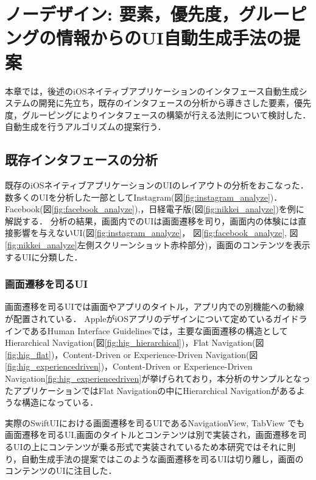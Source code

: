 \chapter{ノーデザイン: 要素，優先度，グルーピングの情報からのUI自動生成手法の提案}
\label{chap:auto-gen}

本章では，後述のiOSネイティブアプリケーションのインタフェース自動生成システムの開発に先立ち，既存のインタフェースの分析から導きさした要素，優先度，グルーピングによりインタフェースの構築が行える法則について検討した．自動生成を行うアルゴリズムの提案行う．
\section{既存インタフェースの分析}
既存のiOSネイティブアプリケーションのUIのレイアウトの分析をおこなった．数多くのUIを分析した一部としてInstagram(図\ref{fig:instagram_analyze})． Facebook(図\ref{fig:facebook_analyze}),，日経電子版(図\ref{fig:nikkei_analyze})を例に解説する．
分析の結果，画面内でのUIは画面遷移を司り，画面内の体験には直接影響を与えないUI(図\ref{fig:instagram_analyze}， 図\ref{fig:facebook_analyze}, 図\ref{fig:nikkei_analyze}左側スクリーンショット赤枠部分)，画面のコンテンツを表示するUIに分類した．


\subsection{画面遷移を司るUI}
画面遷移を司るUIでは画面やアプリのタイトル，アプリ内での別機能への動線が配置されている．
AppleがiOSアプリのデザインについて定めているガイドラインであるHuman Interface Guidelines\cite{hignavigation}では，主要な画面遷移の構造としてHierarchical Navigation(図\ref{fig:hig_hierarchical})，Flat Navigation(図\ref{fig:hig_flat})，Content-Driven or Experience-Driven Navigation(図\ref{fig:hig_experiencedriven})，Content-Driven or Experience-Driven Navigation\ref{fig:hig_experiencedriven}が挙げられており，本分析のサンプルとなったアプリケーションではFlat Navigationの中にHierarchical Navigationがあるような構造になっている．

実際のSwiftUIにおける画面遷移を司るUIであるNavigationView\cite{appledevelopernavigationview}, TabView\cite{appledevelopertabview} でも画面遷移を司るUI,画面のタイトルとコンテンツは別で実装され，画面遷移を司るUIの上にコンテンツが乗る形式で実装されているため本研究ではそれに則り，自動生成手法の提案ではこのような画面遷移を司るUIは切り離し，画面のコンテンツのUIに注目した．


